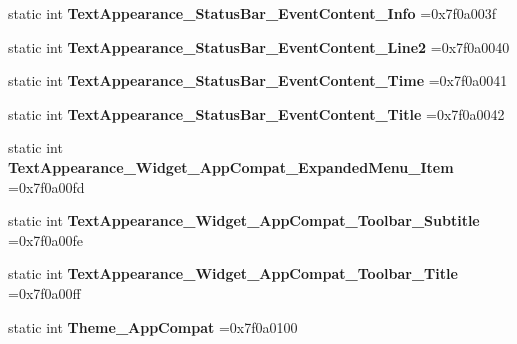 \begin{DoxyCompactItemize}
static int {\bfseries Text\+Appearance\+\_\+\+Status\+Bar\+\_\+\+Event\+Content\+\_\+\+Info} =0x7f0a003f
\item 
\mbox{\label{classandroid_1_1support_1_1v7_1_1cardview_1_1R_1_1style_a7409fb967853c29e648a5ae1496aa554}} 
static int {\bfseries Text\+Appearance\+\_\+\+Status\+Bar\+\_\+\+Event\+Content\+\_\+\+Line2} =0x7f0a0040
\item 
\mbox{\label{classandroid_1_1support_1_1v7_1_1cardview_1_1R_1_1style_a3e0028fafa6ca049e0f13ca081234e54}} 
static int {\bfseries Text\+Appearance\+\_\+\+Status\+Bar\+\_\+\+Event\+Content\+\_\+\+Time} =0x7f0a0041
\item 
\mbox{\label{classandroid_1_1support_1_1v7_1_1cardview_1_1R_1_1style_aa2528d282cf5a8f56bbb809a1338212a}} 
static int {\bfseries Text\+Appearance\+\_\+\+Status\+Bar\+\_\+\+Event\+Content\+\_\+\+Title} =0x7f0a0042
\item 
\mbox{\label{classandroid_1_1support_1_1v7_1_1cardview_1_1R_1_1style_a4b14e9f840907f509ffe6f332aab2995}} 
static int {\bfseries Text\+Appearance\+\_\+\+Widget\+\_\+\+App\+Compat\+\_\+\+Expanded\+Menu\+\_\+\+Item} =0x7f0a00fd
\item 
\mbox{\label{classandroid_1_1support_1_1v7_1_1cardview_1_1R_1_1style_aa714be50052fde3bae1e44b358e4a2d5}} 
static int {\bfseries Text\+Appearance\+\_\+\+Widget\+\_\+\+App\+Compat\+\_\+\+Toolbar\+\_\+\+Subtitle} =0x7f0a00fe
\item 
\mbox{\label{classandroid_1_1support_1_1v7_1_1cardview_1_1R_1_1style_abe0d0db93abd3ffaa17f239ec0a9921f}} 
static int {\bfseries Text\+Appearance\+\_\+\+Widget\+\_\+\+App\+Compat\+\_\+\+Toolbar\+\_\+\+Title} =0x7f0a00ff
\item 
\mbox{\label{classandroid_1_1support_1_1v7_1_1cardview_1_1R_1_1style_a7ce1683158e81b5240eb710183c94e17}} 
static int {\bfseries Theme\+\_\+\+App\+Compat} =0x7f0a0100

\end{DoxyCompactItemize}
